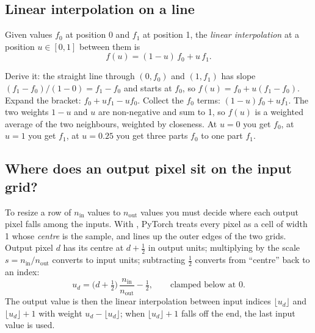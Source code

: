 \subsection{Linear interpolation on a line}

\begin{definition}
Given values $f_0$ at position 0 and $f_1$ at position 1, the \emph{linear
interpolation} at a position $u \in [0, 1]$ between them is
\begin{equation}\label{eq:decoder:lerp}
f(u) = (1 - u)\, f_0 + u\, f_1 .
\end{equation}
\end{definition}
Derive it: the straight line through $(0, f_0)$ and $(1, f_1)$ has slope $(f_1 - f_0)/(1 - 0) = f_1 -
f_0$ and starts at $f_0$, so $f(u) = f_0 + u (f_1 - f_0)$. Expand the bracket: $f_0 + u f_1 - u f_0$.
Collect the $f_0$ terms: $(1 - u) f_0 + u f_1$. The two weights $1 - u$ and $u$ are non-negative and sum
to 1, so $f(u)$ is a weighted average of the two neighbours, weighted by closeness. At $u = 0$ you get
$f_0$, at $u = 1$ you get $f_1$, at $u = 0.25$ you get three parts $f_0$ to one part $f_1$.

\subsection{Where does an output pixel sit on the input grid?}

To resize a row of $n_{\text{in}}$ values to $n_{\text{out}}$ values you must decide where each output
pixel falls among the inputs. With , PyTorch treats every pixel as a cell of
width 1 whose \emph{centre} is the sample, and lines up the outer edges of the two grids. Output pixel
$d$ has its centre at $d + \frac12$ in output units; multiplying by the scale $s = n_{\text{in}} /
n_{\text{out}}$ converts to input units; subtracting $\frac12$ converts from ``centre'' back to an index:
\begin{equation}\label{eq:decoder:src}
u_d = \Big(d + \tfrac12\Big)\, \frac{n_{\text{in}}}{n_{\text{out}}} - \tfrac12, \qquad \text{clamped below at } 0 .
\end{equation}
The output value is then the linear interpolation between input indices $\lfloor u_d \rfloor$ and
$\lfloor u_d \rfloor + 1$ with weight $u_d - \lfloor u_d \rfloor$; when $\lfloor u_d \rfloor + 1$ falls
off the end, the last input value is used.

